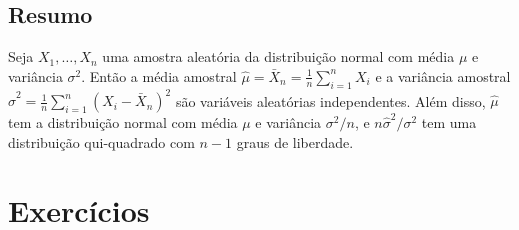 \subsection*{Resumo}

Seja $X_1, \dots, X_n$ uma amostra aleatória da distribuição normal com média $\mu$ e variância $\sigma^2$. Então a média amostral $\hat{\mu} = \bar{X}_n = \frac{1}{n}\sum_{i=1}^n X_i$ e a variância amostral $\hat{\sigma}^2 = \frac{1}{n}\sum_{i=1}^n(X_i - \bar{X}_n)^2$ são variáveis aleatórias independentes. Além disso, $\hat{\mu}$ tem a distribuição normal com média $\mu$ e variância $\sigma^2/n$, e $n\hat{\sigma}^2/\sigma^2$ tem uma distribuição qui-quadrado com $n-1$ graus de liberdade.

\section*{Exercícios}

